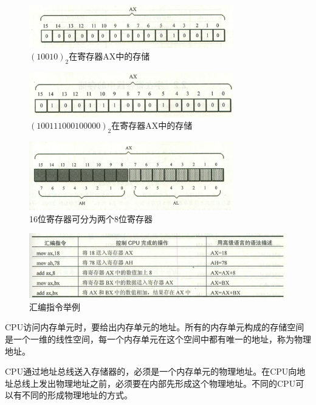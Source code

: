 \begin{frame}
\begin{figure}
\centering
\includegraphics[width=3.5in]{ch01/fig/tongyongjicunqi2}
\caption{$(10010)_2$在寄存器AX中的存储}
\end{figure}
 
\begin{figure}
\centering
\includegraphics[width=3.5in]{ch01/fig/tongyongjicunqi3}
\caption{$(100111000100000)_2$在寄存器AX中的存储}
\end{figure}
\end{frame}
%
%
%
\begin{frame}
\begin{figure}
\centering
\includegraphics[width=3.5in]{ch01/fig/tongyongjicunqi4}
\caption{16位寄存器可分为两个8位寄存器}
\end{figure}
\end{frame}

\begin{frame}
\begin{figure}
\centering
\includegraphics[width=4.5in]{ch01/fig/huibianzhiling1}
\caption{汇编指令举例}
\end{figure}
\end{frame}

\begin{frame}
CPU访问内存单元时，要给出内存单元的地址。所有的内存单元构成的存储空间是一个一维的线性空间，每一个内存单元在这个空间中都有唯一的地址，称为物理地址。\vspace{0.1in}

CPU通过地址总线送入存储器的，必须是一个内存单元的物理地址。在CPU向地址总线上发出物理地址之前，必须要在内部先形成这个物理地址。不同的CPU可以有不同的形成物理地址的方式。
\end{frame}

